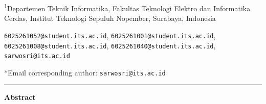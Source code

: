 \documentclass[10pt,a4paper,twocolumn]{article}
\begin{document}
{%
{\fontsize{9}{11}\selectfont
 \textsuperscript{1}Departemen Teknik Informatika, Fakultas Teknologi Elektro dan
 Informatika Cerdas, Institut Teknologi Sepuluh Nopember, Surabaya, Indonesia\par
 \vspace{2pt}
 \texttt{6025261052@student.its.ac.id}, \texttt{6025261001@student.its.ac.id}, \texttt{6025261008@student.its.ac.id},
 \texttt{6025261040@student.its.ac.id},
 \texttt{sarwosri@its.ac.id}\par
 \vspace{2pt}
 *Email corresponding author: \texttt{sarwosri@its.ac.id}\par}
\vspace{8pt}

\noindent\rule{\textwidth}{0.4pt}\par\vspace{4pt}
\begin{minipage}{\textwidth}
\raggedright
{\bfseries Abstract}\par\vspace{3pt}
{\fontsize{9}{11}\selectfont\itshape\justifying
}
\end{minipage}}
\end{document}
